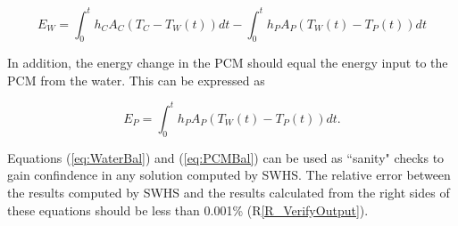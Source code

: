 \documentclass[12pt]{article}
\newcommand{\rref}[1]{R\ref{#1}}
\newcommand{\progname}{SWHS}
\begin{document}
\begin{equation}
E_W = \int_{0}^{t} h_C A_C (T_C - T_W(t)) dt - \int_{0}^{t} h_P A_P (T_W(t) - T_P(t)) dt \label{eq:WaterBal}
\end{equation}

\noindent
In addition, the energy change in the PCM should equal the energy input to 
the PCM from the water. This can be expressed as

\begin{equation}
E_{P} = \int_{0}^{t} h_{P} A_{P} (T_{W}(t) - T_{P}(t)) dt. \label{eq:PCMBal}
\end{equation}

\noindent
Equations (\ref{eq:WaterBal}) and (\ref{eq:PCMBal}) can be used as ``sanity" checks
to gain confindence in any solution computed by \progname{}. The relative error 
between the results computed by \progname{} and the results calculated from the
right sides of these equations should be less than 0.001\% (\rref{R_VerifyOutput}).
\end{document}

